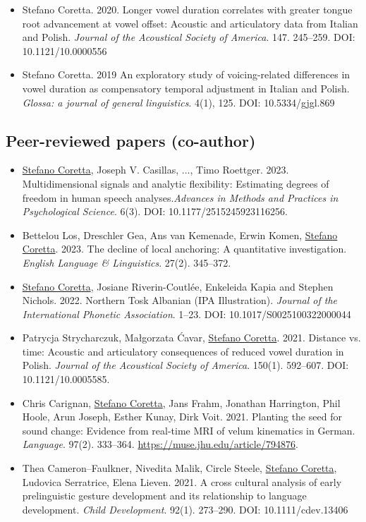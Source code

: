 \documentclass{article}
\begin{document}
\begin{itemize}
\item Stefano Coretta. 2020. Longer vowel duration correlates with greater tongue root advancement at vowel offset: Acoustic and articulatory data from Italian and Polish. \textit{Journal of the Acoustical Society of America}. 147. 245--259. DOI: 10.1121/10.0000556

\item Stefano Coretta. 2019 An exploratory study of voicing-related differences in vowel duration as compensatory temporal adjustment in Italian and Polish. \textit{Glossa: a journal of general linguistics}. 4(1), 125. DOI: 10.5334/gjgl.869
\end{itemize}

\subsection{Peer-reviewed papers (co-author)}

\begin{itemize}
\item \underline{Stefano Coretta}, Joseph V. Casillas, ..., Timo Roettger. 2023. Multidimensional signals and analytic flexibility: Estimating degrees of freedom in human speech analyses.\textit{Advances in Methods and Practices in Psychological Science}. 6(3). DOI: 10.1177/2515245923116256.

\item Bettelou Los, Dreschler Gea, Ans van Kemenade, Erwin Komen, \underline{Stefano Coretta}. 2023. The decline of local anchoring: A quantitative investigation. \textit{English Language \& Linguistics}. 27(2). 345--372.

\item \underline{Stefano Coretta}, Josiane Riverin-Coutlée, Enkeleida Kapia and Stephen Nichols. 2022. Northern Tosk Albanian (IPA Illustration). \textit{Journal of the International Phonetic Association}. 1--23. DOI: 10.1017/S0025100322000044

\item Patrycja Strycharczuk, Małgorzata Ćavar, \underline{Stefano Coretta}. 2021. Distance vs. time: Acoustic and articulatory consequences of reduced vowel duration in Polish. \textit{Journal of the Acoustical Society of America}. 150(1). 592--607. DOI: 10.1121/10.0005585.

\item Chris Carignan, \underline{Stefano Coretta}, Jans Frahm, Jonathan Harrington, Phil Hoole, Arun Joseph, Esther Kunay, Dirk Voit. 2021. Planting the seed for sound change: Evidence from real-time MRI of velum kinematics in German. \textit{Language}. 97(2). 333--364. \url{https://muse.jhu.edu/article/794876}.

\item Thea Cameron--Faulkner, Nivedita Malik, Circle Steele, \underline{Stefano Coretta}, Ludovica Serratrice, Elena Lieven. 2021. A cross cultural analysis of early prelinguistic gesture development and its relationship to language development. \textit{Child Development}. 92(1). 273--290. DOI: 10.1111/cdev.13406
\end{itemize}
\end{document}
